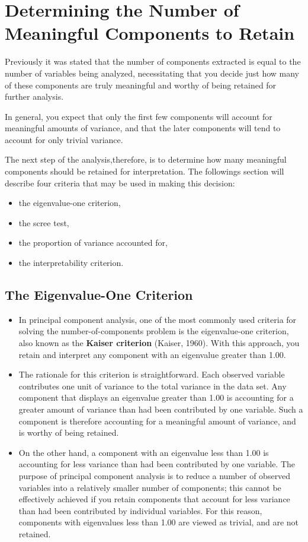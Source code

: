 \documentclass[]{article}
\begin{document}
\newpage
\section{Determining the Number of Meaningful Components to Retain}
Previously it was stated that the number of components extracted is equal to the number of variables
being analyzed, necessitating that you decide just how many of these components are truly
meaningful and worthy of being retained for further analysis.

In general, you expect
that only the first few components will account for meaningful amounts of variance, and that the
later components will tend to account for only trivial variance.

The next step of the analysis,therefore, is to determine how many meaningful components should be retained for
interpretation.  The followings section will describe four criteria that may be used in making this decision:
\begin{itemize} \item the eigenvalue-one criterion, \item the scree test, \item the proportion of variance accounted for, \item the
	interpretability criterion.
\end{itemize}


\subsection{The Eigenvalue-One Criterion}  
\begin{itemize}
\item In principal component analysis, one of the most commonly
used criteria for solving the number-of-components problem is the eigenvalue-one criterion, also
known as the \textbf{Kaiser criterion} (Kaiser, 1960).  With this approach, you retain and interpret any
component with an eigenvalue greater than 1.00.
\item
The rationale for this criterion is straightforward.  Each observed variable contributes one unit of
variance to the total variance in the data set.  Any component that displays an eigenvalue greater
than 1.00 is accounting  for a greater amount of variance than had been contributed by one
variable.  Such a component is therefore accounting for a meaningful amount of variance, and is
worthy of being retained.
\item
On the other hand, a component with an eigenvalue less than 1.00 is accounting for less variance
than had been contributed by one variable.  The purpose of principal component analysis is to
reduce a number of observed variables into a relatively smaller number of components; this
cannot be effectively achieved if you retain components that account for less variance than had
been contributed by individual variables.  For this reason, components with eigenvalues less than
1.00 are viewed as trivial, and are not retained.
\end{itemize}
\newpage
\end{document}
